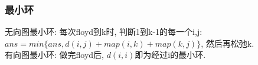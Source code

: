 \subsubsection{最小环}
\noindent
无向图最小环: 每次floyd到k时, 判断1到k-1的每一个i,j: $ans = min\{ans, d(i,j)+map(i,k)+map(k,j)\}$, 然后再松弛k.\\
有向图最小环: 做完floyd后, $d(i,i)$即为经过i的最小环.